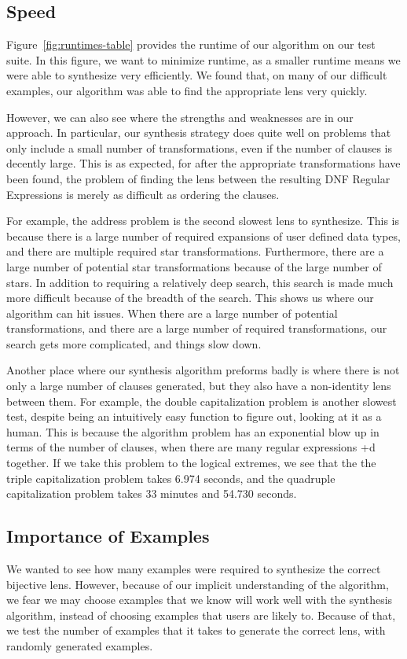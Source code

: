 \documentclass[numbers]{sigplanconf}
\begin{document}
\subsection{Speed}
Figure~\ref{fig:runtimes-table} provides the runtime of our algorithm on our
test suite.
In this figure, we want to minimize runtime, as a smaller runtime means we were
able to synthesize very efficiently.
We found that, on many of our difficult examples, our algorithm was able to find
the appropriate lens very quickly.

However, we can also see where the strengths and weaknesses are in our approach.
In particular, our synthesis strategy does quite well on problems that only
include a small number of transformations, even if the number of clauses is
decently large.
This is as expected, for after the appropriate transformations have been found,
the problem of finding the lens between the resulting DNF Regular Expressions
is merely as difficult as ordering the clauses.

For example, the address problem is the second slowest lens to synthesize.
This is because there is a large number of required expansions of user defined
data types, and there are multiple required star transformations.
Furthermore, there are a large number of potential star transformations because
of the large number of stars.
In addition to requiring a relatively deep search, this search is made much
more difficult because of the breadth of the search.
This shows us where our algorithm can hit issues.
When there are a large number of potential transformations, and there are a
large number of required transformations, our search gets more complicated,
and things slow down.

Another place where our synthesis algorithm preforms badly is where there is not
only a large number of clauses generated, but they also have a non-identity
lens between them.
For example, the double capitalization problem is another slowest test, despite
being an intuitively easy function to figure out, looking at it as a human.
This is because the algorithm problem has an exponential blow up in terms
of the number of clauses, when there are many regular expressions +d together.
If we take this problem to the logical extremes, we see that the the triple
capitalization problem takes 6.974 seconds, and the quadruple capitalization
problem takes 33 minutes and 54.730 seconds.

\subsection{Importance of Examples}
We wanted to see how many examples were required to synthesize the correct
bijective lens.
However, because of our implicit understanding of the algorithm, we fear we may
choose examples that we know will work well with the synthesis algorithm,
instead of choosing examples that users are likely to.
Because of that, we test the number of examples that it takes to generate the
correct lens, with randomly generated examples.
\end{document}
